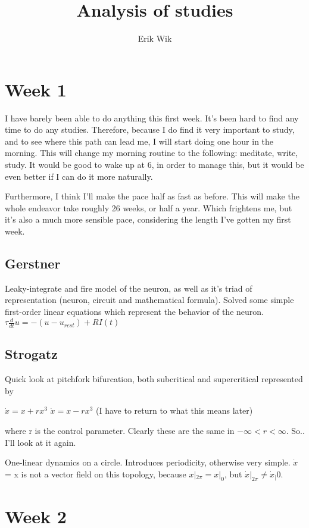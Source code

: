 \documentclass[]{article}
\title{Analysis of studies}
\author{Erik Wik}
\begin{document}
\maketitle


\section{Week 1}

I have barely been able to do anything this first week. It's been hard to find any time to do any studies. Therefore, because I do find it very important to study, and to see where this path can lead me, I will start doing one hour in the morning. This will change my morning routine to the following: meditate, write, study. It would be good to wake up at 6, in order to manage this, but it would be even better if I can do it more naturally. 

Furthermore, I think I'll make the pace half as fast as before. This will make the whole endeavor take roughly 26 weeks, or half a year. Which frightens me, but it's also a much more sensible pace, considering the length I've gotten my first week. 



\subsection{ Gerstner }

Leaky-integrate and fire model of the neuron, as well as it's triad of representation (neuron, circuit and mathematical formula). Solved some simple first-order linear equations which represent the behavior of the neuron. 
$\tau \frac{d}{dt}u = -(u - u_{rest}) + RI(t)$


\subsection{Strogatz }


Quick look at pitchfork bifurcation, both subcritical and supercritical represented by 

$\dot{x} = x + rx^{3}$
$\dot{x} = x - rx^{3}$ (I have to return to what this means later)


where r is the control parameter. Clearly these are the same in $-\infty < r <\infty$. 
So.. I'll look at it again.


One-linear dynamics on a circle. Introduces periodicity, otherwise very simple. 
$\dot{x}$ = x is not a vector field on this topology, because $x|_{2\pi} = x|_{0}$, but $\dot{x}|_{2\pi} \neq \dot{x}_|{0}$. 

\newpage
\section{Week 2}
\end{document}
